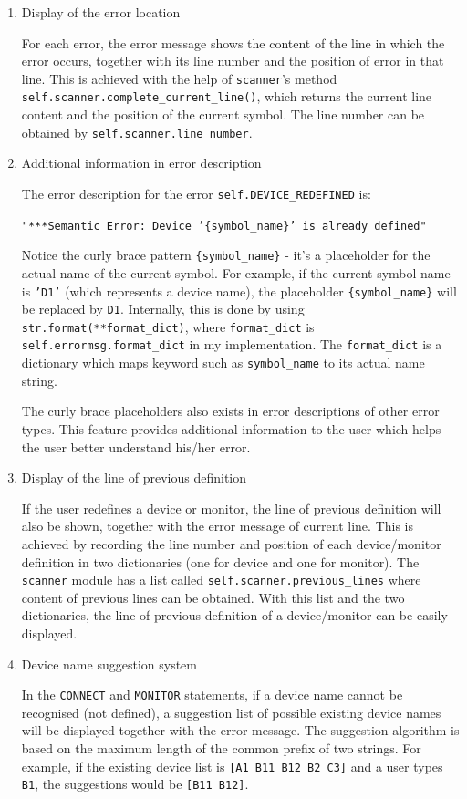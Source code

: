 \documentclass[10pt,a4paper]{article}
\begin{document}
\begin{enumerate}
\item Display of the error location
\label{sec:org273f36a}

For each error, the error message shows the content of the line in
which the error occurs, together with its line number and the position
of error in that line. This is achieved with the help of \texttt{scanner}'s
method \texttt{self.scanner.complete\_current\_line()}, which returns the
current line content and the position of the current symbol. The line
number can be obtained by \texttt{self.scanner.line\_number}. 

\item Additional information in error description
\label{sec:org6f20565}

The error description for the error \texttt{self.DEVICE\_REDEFINED} is:

\texttt{"***Semantic Error: Device '\{symbol\_name\}' is already defined"}

Notice the curly brace pattern \texttt{\{symbol\_name\}} - it's a placeholder
for the actual name of the current symbol. For example, if the current
symbol name is \texttt{'D1'} (which represents a device name), the
placeholder \texttt{\{symbol\_name\}} will be replaced by \texttt{D1}. Internally, this
is done by using \texttt{str.format(**format\_dict)}, where \texttt{format\_dict} is
\texttt{self.errormsg.format\_dict} in my implementation. The \texttt{format\_dict} is
a dictionary which maps keyword such as \texttt{symbol\_name} to its actual
name string. 

The curly brace placeholders also exists in error descriptions of
other error types. This feature provides additional information to the
user which helps the user better understand his/her error.

\item Display of the line of previous definition
\label{sec:org6d76d80}

If the user redefines a device or monitor, the line of previous
definition will also be shown, together with the error message of
current line. This is achieved by recording the line number and
position of each device/monitor definition in two dictionaries (one
for device and one for monitor). The \texttt{scanner} module has a list
called \texttt{self.scanner.previous\_lines} where content of previous lines
can be obtained. With this list and the two dictionaries, the line of
previous definition of a device/monitor can be easily displayed.

\item Device name suggestion system
\label{sec:orga7f4ad8}

In the \texttt{CONNECT} and \texttt{MONITOR} statements, if a device name cannot be
recognised (not defined), a suggestion list of possible existing
device names will be displayed together with the error message. The
suggestion algorithm is based on the maximum length of the common
prefix of two strings. For example, if the existing device list is
\texttt{[A1 B11 B12 B2 C3]} and a user types \texttt{B1}, the suggestions would be
\texttt{[B11 B12]}.
\end{enumerate}
\end{document}
